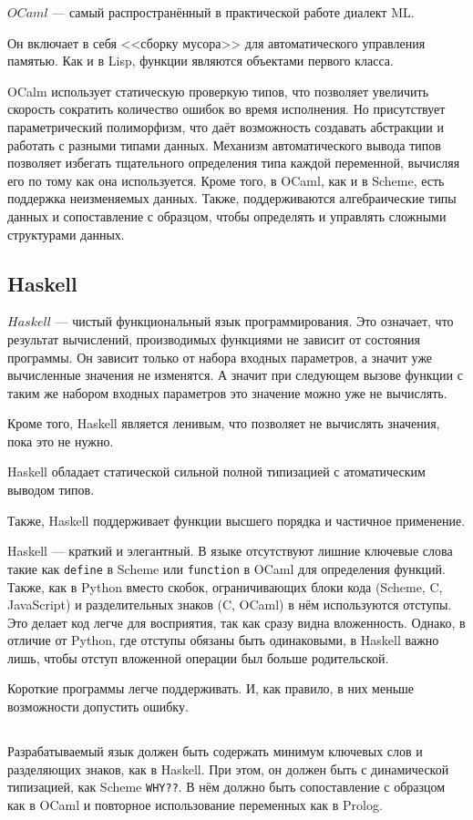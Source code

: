         $OCaml$ --- самый распространённый в практической работе диалект ML.

        Он включает в себя <<сборку мусора>> для автоматического управления памятью.
        Как и в Lisp, функции являются объектами первого класса.

        OCalm использует статическую проверкую типов, что позволяет увеличить скорость сократить количество ошибок во время исполнения.
        Но присутствует параметрический полиморфизм, что даёт возможность создавать абстракции и работать с разными типами данных.
        Механизм автоматического вывода типов позволяет избегать тщательного определения типа каждой переменной, вычисляя его по тому как она используется.
        Кроме того, в OCaml, как и в Scheme, есть поддержка неизменяемых данных.
        Также, поддерживаются алгебраические типы данных и сопоставление с образцом, чтобы определять и управлять сложными структурами данных\cite{ocaml}.

    \subsection{Haskell}
        $Haskell$ --- чистый функциональный язык программирования.
        Это означает, что результат вычислений, производимых функциями не зависит от состояния программы.
        Он зависит только от набора входных параметров, а значит уже вычисленные значения не изменятся.
        А значит при следующем вызове функции с таким же набором входных параметров это значение можно уже не вычислять.

        Кроме того, Haskell является ленивым, что позволяет не вычислять значения, пока это не нужно.

        Haskell обладает статической сильной полной типизацией с атоматическим выводом типов.
        
        Также, Haskell поддерживает функции высшего порядка и частичное применение.

        Haskell --- краткий и элегантный\cite{haskell}.
        В языке отсутствуют лишние ключевые слова такие как \verb!define! в Scheme или \verb!function! в OCaml для определения функций.
        Также, как в Python вместо скобок, ограничивающих блоки кода (Scheme, C, JavaScript) и разделительных знаков (C, OCaml) в нём используются отступы.
        Это делает код легче для восприятия, так как сразу видна вложенность.
        Однако, в отличие от Python, где отступы обязаны быть одинаковыми, в Haskell важно лишь, чтобы отступ вложенной операции был больше родительской.

        Короткие программы легче поддерживать.
        И, как правило, в них меньше возможности допустить ошибку.

    \subsection{}
        Разрабатываемый язык должен быть содержать минимум ключевых слов и разделяющих знаков, как в Haskell.
        При этом, он должен быть с динамической типизацией, как Scheme \verb!WHY??!.
        В нём должно быть сопоставление с образцом как в OCaml и повторное использование переменных как в Prolog.
